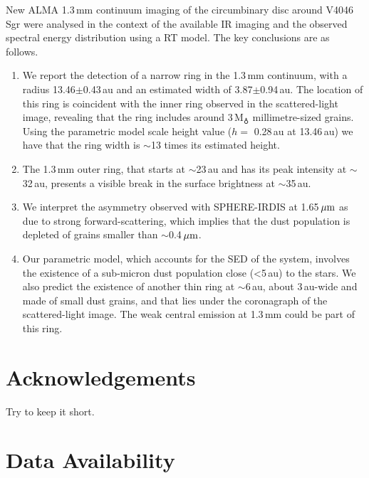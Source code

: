 \documentclass[letters,usenatbib,times]{mnras}
\begin{document}
New ALMA 1.3\,mm continuum imaging of the circumbinary disc around V4046\,Sgr were analysed in the context of the available IR imaging and the observed spectral energy distribution using a RT model.  The key conclusions are as follows.
\begin{enumerate}
  \item We report the detection of a narrow ring in the 1.3\,mm continuum, with a  radius 13.46$\pm$0.43\,au and an estimated width of 3.87$\pm$0.94\,au. The location of this ring is coincident with the inner ring observed in the scattered-light image, revealing that the ring includes around 3\,M$_{\earth}$ millimetre-sized grains. Using the parametric model scale height value ($h= $ 0.28\,au at 13.46\,au) we have that the ring width is $\sim$13 times its estimated height.
  
  \item The 1.3\,mm outer ring, that starts at $\sim$23\,au and has its peak intensity at $\sim$32\,au, presents a visible break in the surface brightness at $\sim$35\,au. 
  
  \item We interpret the asymmetry observed with SPHERE-IRDIS at 1.65\,$\hbox{$\mu$m}$ as due to strong forward-scattering, which implies that the dust population is depleted of grains smaller than $\sim$0.4\,$\hbox{$\mu$m}$.
  
  \item Our parametric model, which accounts for the SED of the system, involves the existence of a sub-micron dust population close (<5\,au) to the stars. We also predict the existence of another thin ring at $\sim$6\,au, about 3\,au-wide and made of small dust grains, and  that lies under the coronagraph of the scattered-light image. The weak central emission at 1.3\,mm could be part of this ring.
\end{enumerate}
  

 \section*{Acknowledgements}

Try to keep it short.
  
\section*{Data Availability}


\end{document}
